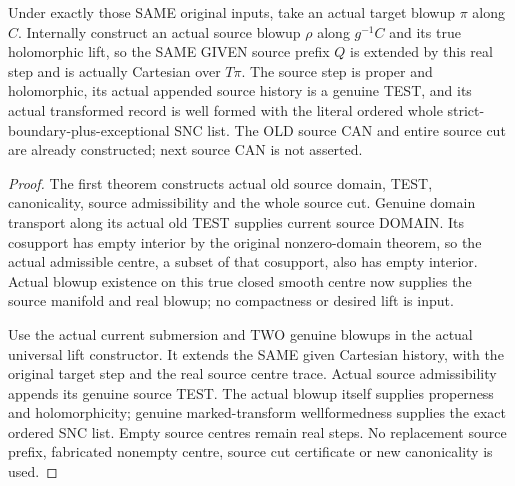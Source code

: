 \begin{theorem}
\label{hir:original-full-cut-actual-source-prefix-extension}
\leanok
Under exactly those SAME original inputs, take an actual target blowup
$\pi$ along $C$. Internally construct an actual source blowup $\rho$ along
$g^{-1}C$ and its true holomorphic lift, so the SAME GIVEN source prefix
$Q$ is extended by this real step and is actually Cartesian over $T\pi$.
The source step is proper and holomorphic, its actual appended source
history is a genuine TEST, and its actual transformed record is well formed
with the literal ordered whole strict-boundary-plus-exceptional SNC list.
The OLD source CAN and entire source cut are already constructed; next
source CAN is not asserted.
\end{theorem}
\begin{proof}
The first theorem constructs actual old source domain, TEST, canonicality,
source admissibility and the whole source cut. Genuine domain transport
along its actual old TEST supplies current source DOMAIN. Its cosupport
has empty interior by the original nonzero-domain theorem, so the actual
admissible centre, a subset of that cosupport, also has empty interior.
Actual blowup existence on this true closed smooth centre now supplies the
source manifold and real blowup; no compactness or desired lift is input.

Use the actual current submersion and TWO genuine blowups in the actual
universal lift constructor. It extends the SAME given Cartesian history,
with the original target step and the real source centre trace. Actual
source admissibility appends its genuine source TEST. The actual blowup
itself supplies properness and holomorphicity; genuine marked-transform
wellformedness supplies the exact ordered SNC list. Empty source centres
remain real steps. No replacement source prefix, fabricated nonempty centre,
source cut certificate or new canonicality is used.
\end{proof}
